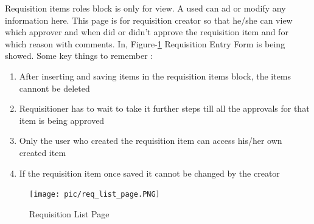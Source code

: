 \documentclass[12pt]{report} %
\begin{document}
Requisition items roles block is only for view. A used can ad or modify any information here. This page is for requisition creator so that he/she can view which approver and when did or didn't approve the requisition item and for which reason with comments.
In, Figure-\ref{fig:req_list_page} Requisition Entry Form is being showed. Some key things to remember :

\renewcommand{\labelenumi}{\alph{enumi})}
\begin{enumerate}

		\item After inserting and saving items in the requisition items block, the items cannont be deleted
		\item Requisitioner has to wait to take it further steps till all the approvals for that item is being approved
		\item Only the user who created the requisition item can access his/her own created item
		\item If the requisition item once saved it cannot be changed by the creator
\end{enumerate}



\begin{landscape}

\begin{figure}[h]
	\begin{center}
	\texttt{[image: pic/req\_list\_page.PNG]}
	\end{center}
	\caption{Requisition List Page}
	\label{fig:req_list_page}
\end{figure}
\thispagestyle{empty} 
\end{landscape}
\clearpage
\end{document}
